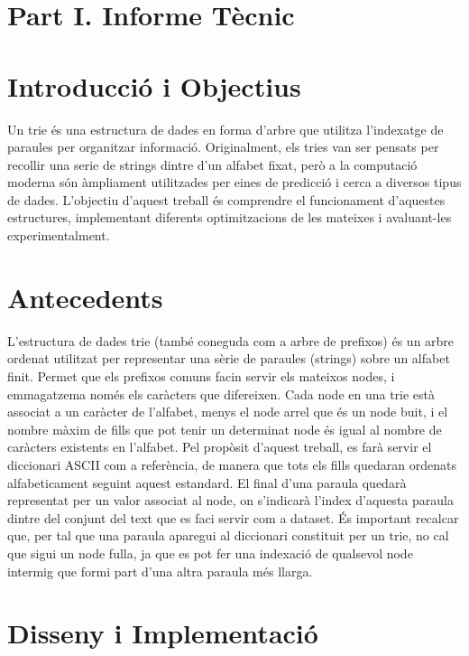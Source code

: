 \section*{\centering Part I. Informe Tècnic}

\section{Introducció i Objectius}

Un trie és una estructura de dades en forma d'arbre que utilitza l'indexatge de paraules per organitzar informació. Originalment, els tries van ser pensats per recollir una serie de strings dintre d'un alfabet fixat, però a la computació moderna són àmpliament utilitzades per eines de predicció i cerca a diversos tipus de dades. L'objectiu d'aquest treball és comprendre el funcionament d'aquestes estructures, implementant diferents optimitzacions de les mateixes i avaluant-les experimentalment. 

\section{Antecedents}

L'estructura de dades trie (també coneguda com a arbre de prefixos) és un arbre ordenat utilitzat per representar una sèrie de paraules (strings) sobre un alfabet finit. Permet que els prefixos comuns facin servir els mateixos nodes, i emmagatzema només els caràcters que difereixen. Cada node en una trie està associat a un caràcter de l'alfabet, menys el node arrel que és un node buit, i el nombre màxim de fills que pot tenir un determinat node és igual al nombre de caràcters existents en l'alfabet. Pel propòsit d'aquest treball, es farà servir el diccionari ASCII com a referència, de manera que tots els fills quedaran ordenats alfabeticament seguint aquest estandard. El final d'una paraula quedarà representat per un valor associat al node, on s'indicarà l'index d'aquesta paraula dintre del conjunt del text que es faci servir com a dataset. És important recalcar que, per tal que una paraula aparegui al diccionari constituit per un trie, no cal que sigui un node fulla, ja que es pot fer una indexació de qualsevol node intermig que formi part d'una altra paraula més llarga. 


\section{Disseny i Implementació}

